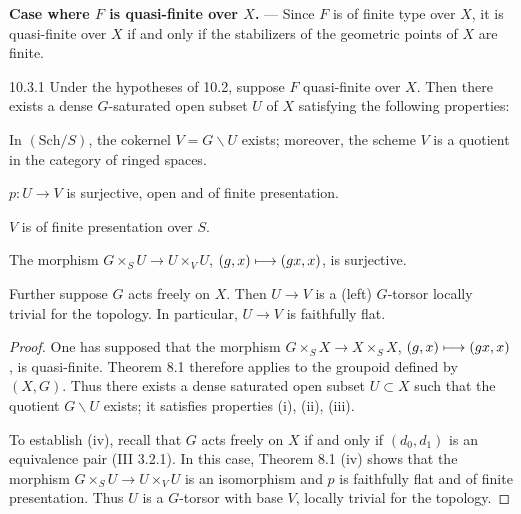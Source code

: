 \textbf{Case where $F$ is quasi-finite over $X$.} --- Since $F$ is of finite type over $X$, it is quasi-finite over $X$ if and only if the stabilizers of the geometric points of $X$ are finite.
\begin{theorem}{10.3.1}\label{V.10.3.1}
Under the hypotheses of 10.2, suppose $F$ quasi-finite over $X$. Then there exists a dense $G$-saturated open subset $U$ of $X$ satisfying the following properties:
\begin{enumeratei}
\item In $(\mathrm{Sch}/S)$, the cokernel $V=G\backslash U$ exists; moreover, the scheme $V$ is a quotient in the category of ringed spaces.
\item $p:U\to V$ is surjective, open and of finite presentation.
\item $V$ is of finite presentation over $S$.
\item The morphism $G\times_SU\to U\times_VU$, $(g,x)\longmapsto(gx,x)$, is surjective.
\item Further suppose $G$ acts freely on $X$. Then $U\to V$ is a (left) $G$-torsor locally trivial for the \fppf topology. In particular, $U\to V$ is faithfully flat.
\end{enumeratei}
\end{theorem}
\begin{proof}
One has supposed that the morphism $G\times_SX\to X\times_SX$, $(g,x)\longmapsto(gx,x)$, is quasi-finite. Theorem 8.1 therefore applies to the groupoid defined by $(X,G)$. Thus there exists a dense saturated open subset $U\subset X$ such that the quotient $G\backslash U$ exists; it satisfies properties (i), (ii), (iii).

To establish (iv), recall that $G$ acts freely on $X$ if and only if $(d_0,d_1)$ is an equivalence pair (III 3.2.1). In this case, Theorem 8.1 (iv) shows that the morphism $G\times_SU\to U\times_VU$ is an isomorphism and $p$ is faithfully flat and of finite presentation. Thus $U$ is a $G$-torsor with base $V$, locally trivial for the \fppf topology.
\end{proof}


